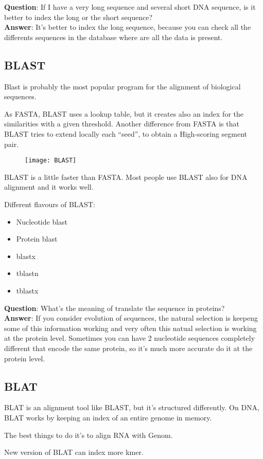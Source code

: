 \textbf{Question}: If I have a very long sequence and several short DNA
sequence, is it better to index the long or the short sequence? \\

\textbf{Answer}: It's better to index the long sequence, because you can
check all the differents sequences in the database where are all the data is
present.

\subsection{BLAST}

Blast is probably the most popular program for the alignment of biological
sequences.

As FASTA, BLAST uses a lookup table, but it creates also an index for the
similarities with a given threshold. Another difference from FASTA is that
BLAST tries to extend locally each ``seed'', to obtain a High-scoring segment
pair.

\begin{figure}[H]
  \centering
  \texttt{[image: BLAST]}
  \label{fig:blast}
\end{figure}

BLAST is a little faster than FASTA. Most people use BLAST also for DNA
alignment and it works well.

Different flavours of BLAST:
\begin{itemize}
  \item Nucleotide blast
  \item Protein blast
  \item blastx
  \item tblastn
  \item tblastx
\end{itemize}

\textbf{Question}: What's the meaning of translate the sequence in proteins? \\

\textbf{Answer}: If you consider evolution of sequences, the natural selection
is keepeng some of this information working and very often this natual
selection is working at the protein level.
Sometimes you can have 2 nucleotide sequences completely different that
encode the same protein, so it's much more accurate do it at the protein level.

\subsection{BLAT}

BLAT is an alignment tool like BLAST, but it's structured differently. On DNA,
BLAT works by keeping an index of an entire genome in memory.

The best things to do it's to align RNA with Genom.

New version of BLAT can index more kmer.

